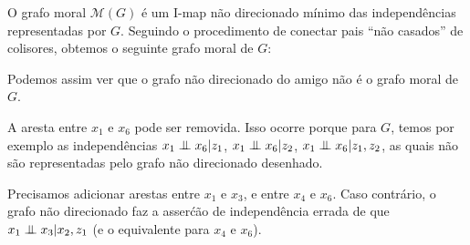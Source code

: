 \begin{solution}
    O grafo moral $\mathcal{M}(G)$ \'e um I-map n\~ao direcionado m\'inimo das independ\^encias representadas por $G$. Seguindo o procedimento de conectar pais ``n\~ao casados'' de colisores, obtemos o seguinte grafo moral de $G$:
    
    \begin{center}
\end{center}
Podemos assim ver que o grafo n\~ao direcionado do amigo n\~ao \'e o grafo moral de $G$.

A aresta entre $x_1$ e $x_6$ pode ser removida. Isso ocorre porque para $G$, temos por exemplo as independ\^encias $x_1 \mathrel{\perp\mspace{-10mu}\perp} x_6 | z_1$, $x_1 \mathrel{\perp\mspace{-10mu}\perp} x_6 | z_2$, $x_1 \mathrel{\perp\mspace{-10mu}\perp} x_6 | z_1, z_2$, as quais n\~ao s\~ao representadas pelo grafo n\~ao direcionado desenhado.

Precisamos adicionar arestas entre $x_1$ e $x_3$, e entre $x_4$ e $x_6$. Caso contr\'ario, o grafo n\~ao direcionado faz a asser\'c\~ao de independ\^encia errada de que $x_1 \mathrel{\perp\mspace{-10mu}\perp} x_3 | x_2, z_1$ (e o equivalente para $x_4$ e $x_6$).

\end{solution}


\label{ex:undirected-to-DAG-alt}

